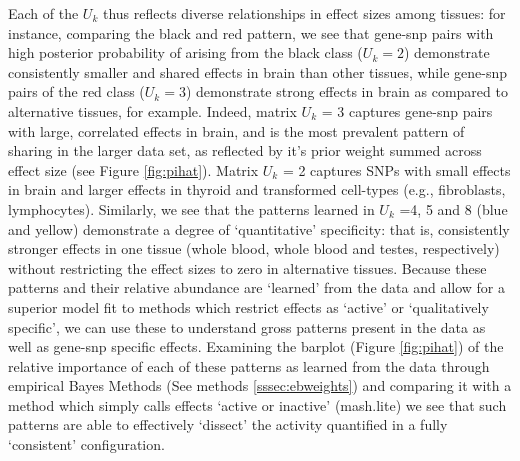 Each of the $U_{k}$ thus reflects diverse relationships in effect sizes among tissues: for instance, comparing the black and red pattern, we see that gene-snp pairs with high posterior probability of arising from the black class ($U_{k}=2$) demonstrate consistently smaller and shared effects in brain than other tissues, while gene-snp pairs of the red class ($U_{k}=3$) demonstrate strong effects in brain as compared to alternative tissues, for example. Indeed, matrix $U_{k}$ = 3 captures gene-snp pairs with large, correlated effects in brain, and is the most prevalent pattern of sharing in the larger data set, as reflected by it's prior weight summed across effect size (see Figure \ref{fig:pihat}). Matrix $U_{k}$ = 2 captures SNPs with small effects in brain and larger effects in thyroid and transformed cell-types (e.g., fibroblasts, lymphocytes).
Similarly, we see that the patterns learned in $U_{k}$ =4, 5 and 8 (blue and yellow) demonstrate a degree of `quantitative' specificity: that is, consistently stronger effects in one tissue (whole blood, whole blood and testes, respectively) without restricting the effect sizes to zero in alternative tissues. Because these patterns and their relative abundance are `learned' from the data and allow for a superior model fit to methods which restrict effects as `active' or `qualitatively specific', we can use these to understand gross patterns present in the data as well as gene-snp specific effects. Examining the barplot (Figure \ref{fig:pihat}) of the relative importance of each of these patterns as learned from the data through empirical Bayes Methods (See methods \ref{sssec:ebweights}) and comparing it with a method which simply calls effects `active or inactive' (mash.lite) we see that such patterns are able to effectively `dissect' the activity quantified in a fully `consistent' configuration.

%




